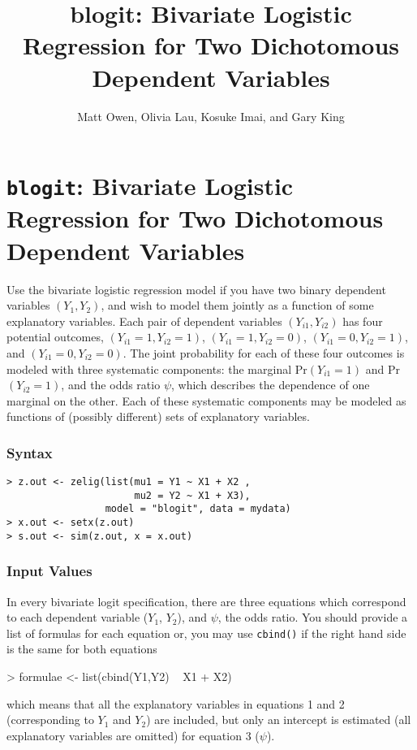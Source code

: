 \documentclass{article}
\title{blogit: Bivariate Logistic Regression for Two Dichotomous Dependent Variables}
\author{Matt Owen, Olivia Lau, Kosuke Imai, and Gary King}
\begin{document}
\section{{\tt blogit}: Bivariate Logistic Regression for Two
Dichotomous Dependent Variables}\label{blogit}

Use the bivariate logistic regression model if you have two binary
dependent variables $(Y_1, Y_2)$, and wish to model them jointly as a
function of some explanatory variables.  Each pair of dependent
variables $(Y_{i1}, Y_{i2})$ has four potential outcomes, $(Y_{i1}=1,
Y_{i2}=1)$, $(Y_{i1}=1, Y_{i2}=0)$, $(Y_{i1}=0, Y_{i2}=1)$, and
$(Y_{i1}=0, Y_{i2}=0)$.  The joint probability for each of these four
outcomes is modeled with three systematic components: the marginal
Pr$(Y_{i1} = 1)$ and Pr$(Y_{i2} = 1)$, and the odds ratio $\psi$,
which describes the dependence of one marginal on the other.  Each of
these systematic components may be modeled as functions of (possibly
different) sets of explanatory variables.

\subsubsection{Syntax}

\begin{verbatim}
> z.out <- zelig(list(mu1 = Y1 ~ X1 + X2 , 
                      mu2 = Y2 ~ X1 + X3), 
                 model = "blogit", data = mydata)
> x.out <- setx(z.out)
> s.out <- sim(z.out, x = x.out)
\end{verbatim}

\subsubsection{Input Values}

In every bivariate logit specification, there are three equations which
correspond to each dependent variable ($Y_1$, $Y_2$), and $\psi$, the
odds ratio. You should provide a list of formulas for each equation or, 
you may use {\tt cbind()} if the right hand side is the same for both equations
\begin{Schunk}
\begin{Sinput}
> formulae <- list(cbind(Y1,Y2) ~ X1 + X2)
\end{Sinput}
\end{Schunk}
which means that all the explanatory variables in equations 1 and 2
(corresponding to $Y_1$ and $Y_2$) are included, but only an intercept
is estimated (all explanatory variables are omitted) for equation 3
($\psi$).  
\end{document}
